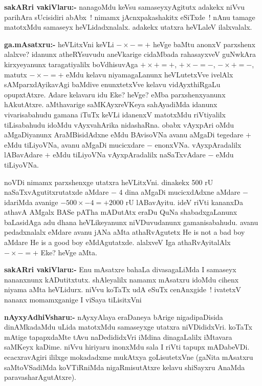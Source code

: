 \smallskip
\noindent
\textbf{sakARri vakiVlaru:-} nanagoMdu keVsu samaseyxyAgitutx adakekx niVvu parihAra sUcisidiri abAbx~! nimamx jAcnxpakashakitx eSiTxde~! nAnu tamage matotxMdu samaseyx heVLidadxnalalx. adakekx utatxra heVLaleV ilalxvalalx.

\smallskip
\noindent
\textbf{ga.mAsatxru:-} heVLitxVni keVLi $-\times -=+$ heVge baMtu anonxV parxshenx alalxve? idanunx atheRYsuvudu aneVkarige cidaMbada rahasayxveV guNwkAra kirxyeyanunx taragatiyalilx boVdhisuvAga $+\times +=+$, \quad $+\times -=-$, \quad $-\times +=-$, matutx $-\times -=+$ eMdu kelavu niyamagaLanunx heVLutetxVve ivelAlx sAMparxdAyikavAgi baMdive enunxtetxVve kelavu vidAyxthiRgaLu opupxtAtxre. Adare kelavaru idu Eke? heVge? eMba parxshenxyanunx hAkutAtxre. aMthavarige saMKAyxreVKeya sahAyadiMda idanunx vivarisabahudu gamana iTuTx keVLi idanenxV matotxMdu riVtiyalilx tiLisabahudu idoMdu vAyxvahArika nidashaRna. obabx vAyxpAri oMdu aMgaDiyanunx AraMBisidAdxne eMdu BAvisoVNa avanu aMgaDi tegedare $+$ eMdu tiLiyoVNa, avanu aMgaDi mucicxdare $-$ enonxVNa. vAyxpAradalilx lABavAdare $+$ eMdu tiLiyoVNa vAyxpAradalilx naSaTxvAdare $-$ eMdu tiLiyoVNa.

noVDi nimamx parxshenxge utatxra heVLitxVni. dinakekx {\rm 500} rU naSaTxvAgutitxrutatxde aMdare $-$ {\rm 4} dina aMgaDi mucicxdAdxne aMdare $-$ idariMda avanige $-500\times -4=+2000$ rU lABavAyitu. ideV riVti kananxDa athavA AMgalx BASe pATha mADutAtx eraDu QuNa shabadxgaLanunx baLasidAga adu dhana heVLikeyanunx niVDuvudanunx gamanisabahudu. avanu pedadxnalalx eMdare avanu jANa aMta athaRvAgutetx {\rm He is not a bad boy} aMdare {\rm He is a good boy} eMdAgutatxde. alalxveV Iga athaRvAyitalAlx $-\times -=+$ Eke? heVge aMta.

\smallskip
\noindent
\textbf{sakARri vakiVlaru:-} Enu mAsatxre bahaLa divasagaLiMda I samaseyx nananxnunx kADutitxtutx. shAleyalilx namamx mAsatxru idoMdu cihenx niyama aMta heVLidurx. niVvu koTaTx udA eSuTx cenAnxgide~! ivatetxV nananx momamxganige I viSaya tiLisitxVni

\smallskip
\noindent
\textbf{nAyxyAdhiVsharu:-} nAyxyAlaya eraDaneya bArige nigadipaDisida dinAMkadaMdu uLida matotxMdu samaseyxge utatxra niVDididxVri. koTaTx mAtige tapapxdaMte tAvu naDedididxVri iMdina dinagaLalilx iMtavara saMKeyx kaDime. niVvu hiriyaru inonxMdu sala I riVti tapupx mADabeVDi. ecacxravAgiri ililxge mokadadxme mukAtxya goLisutetxVne (gaNita mAsatxru saMtoVSadiMda koVTiRniMda nigaRmisutAtxre kelavu shiSayxru AnaMda paravasharAgutAtxre).
